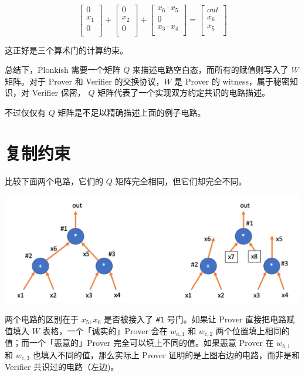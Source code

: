 \[
\left[
\begin{array}{c}
0 \\
x_1 \\
0\\
\end{array}
\right]
+
\left[
\begin{array}{c}
0 \\
x_2 \\
0\\
\end{array}
\right]
+
\left[
\begin{array}{c}
x_6\cdot x_5 \\
0 \\
x_3\cdot x_4\\
\end{array}
\right]=\left[
\begin{array}{c}
out \\
x_6 \\
x_5\\
\end{array}
\right]
\]

这正好是三个算术门的计算约束。

总结下，Plonkish 需要一个矩阵 \(Q\)
来描述电路空白态，而所有的赋值则写入了 \(W\) 矩阵。对于 Prover 和
Verifier 的交换协议，\(W\) 是 Prover 的 witness，属于秘密知识，对
Verifier 保密， \(Q\) 矩阵代表了一个实现双方约定共识的电路描述。

不过仅仅有 \(Q\) 矩阵是不足以精确描述上面的例子电路。

\hypertarget{ux590dux5236ux7ea6ux675f}{%
\section{复制约束}\label{ux590dux5236ux7ea6ux675f}}

比较下面两个电路，它们的 \(Q\) 矩阵完全相同，但它们却完全不同。

\includegraphics[scale=0.3]{img/img20230414205219.png}

两个电路的区别在于 \(x_5, x_6\) 是否被接入了 \texttt{\#1} 号门。如果让
Prover 直接把电路赋值填入 \(W\) 表格，一个「诚实的」Prover 会在
\(w_{a,1}\) 和 \(w_{c,2}\) 两个位置填上相同的值；而一个「恶意的」Prover
完全可以填上不同的值。如果恶意 Prover 在 \(w_{b,1}\) 和 \(w_{c,3}\)
也填入不同的值，那么实际上 Prover 证明的是上图右边的电路，而非是和
Verifier 共识过的电路（左边)。

